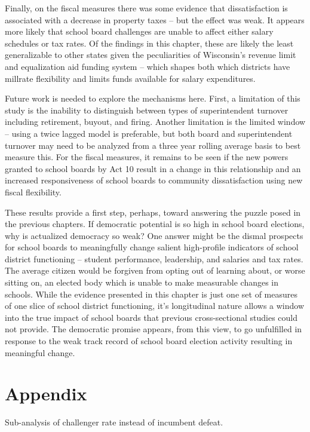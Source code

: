 Finally, on the fiscal measures there was some evidence that dissatisfaction is 
associated with a decrease in property taxes -- but the effect was weak. It 
appears more likely that school board challenges are unable to affect either 
salary schedules or tax rates. Of the findings in this chapter, these are 
likely the least generalizable to other states given the peculiarities of 
Wisconsin's revenue limit and equalization aid funding system -- which shapes 
both which districts have millrate flexibility and limits funds available for 
salary expenditures. 

Future work is needed to explore the mechanisms here. First, a limitation of 
this study is the inability to distinguish between types of superintendent 
turnover including retirement, buyout, and firing. Another limitation is the 
limited window -- using a twice lagged model is preferable, but both board 
and superintendent turnover may need to be analyzed from a three year rolling 
average basis to best measure this. For the fiscal measures, it remains to be 
seen if the new powers granted to school boards by Act 10 result in a change 
in this relationship and an increased responsiveness of school boards to 
community dissatisfaction using new fiscal flexibility. 

These results provide a first step, perhaps, toward answering the puzzle posed 
in the previous chapters. If democratic potential is so high in school board 
elections, why is actualized democracy so weak? One answer might be the dismal 
prospects for school boards to meaningfully change salient high-profile indicators 
of school district functioning -- student performance, leadership, and salaries 
and tax rates. The average citizen would be forgiven from opting out of learning 
about, or worse sitting on, an elected body which is unable to make measurable 
changes in schools. While the evidence presented in this chapter is just one 
set of measures of one slice of school district functioning, it's longitudinal 
nature allows a window into the true impact of school boards that previous 
cross-sectional studies could not provide. The democratic promise appears, from 
this view, to go unfulfilled in response to the weak track record of school board 
election activity resulting in meaningful change. 


\section{Appendix}

Sub-analysis of challenger rate instead of incumbent defeat. 

